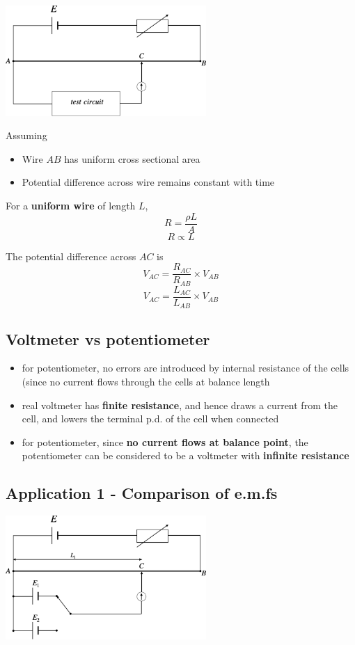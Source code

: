 \documentclass[a4paper, 10pt]{article}
\begin{document}
\begin{center}
  \includegraphics[width=3in]{figures/3.pdf} 
\end{center}	

Assuming 
\begin{itemize}
   \item Wire $AB$ has uniform cross sectional area
   \item Potential difference across wire remains constant with time
\end{itemize}	

For a \textbf{uniform wire} of length $L$,
\[
   R = \frac{\rho L}{A}
\]
\[
R \propto L
\]

The potential difference across $AC$ is
\[
   V_{AC} = \frac{R_{AC}}{R_{AB}} \times V_{AB}
\]
\[
   V_{AC} = \frac{L_{AC}}{L_{AB}} \times V_{AB}
\]

\subsection{Voltmeter vs potentiometer}
\begin{itemize}
   \item for potentiometer, no errors are introduced by internal resistance of the cells (since no current flows through the cells at balance length
   \item real voltmeter has \textbf{finite resistance}, and hence draws a current from the cell, and lowers the terminal p.d. of the cell when connected
   \item for potentiometer, since \textbf{no current flows at balance point}, the potentiometer can be considered to be a voltmeter with \textbf{infinite resistance} 
\end{itemize}

\subsection{Application 1 - Comparison of e.m.fs}
\begin{center}
   \includegraphics[width=3in]{figures/4.pdf} 
\end{center}	
\end{document}
